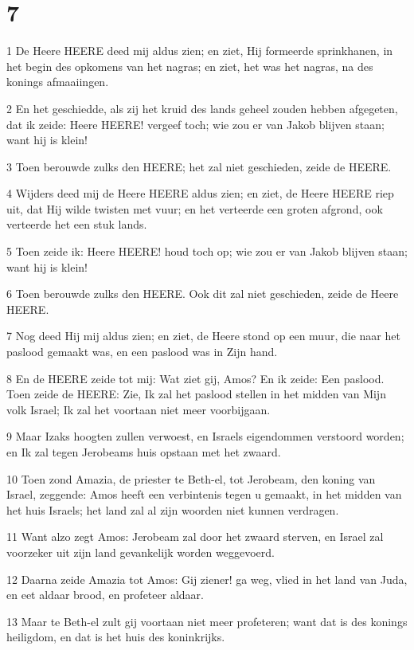 \chapter{7}

\par 1 De Heere HEERE deed mij aldus zien; en ziet, Hij formeerde sprinkhanen, in het begin des opkomens van het nagras; en ziet, het was het nagras, na des konings afmaaiingen.
\par 2 En het geschiedde, als zij het kruid des lands geheel zouden hebben afgegeten, dat ik zeide: Heere HEERE! vergeef toch; wie zou er van Jakob blijven staan; want hij is klein!
\par 3 Toen berouwde zulks den HEERE; het zal niet geschieden, zeide de HEERE.
\par 4 Wijders deed mij de Heere HEERE aldus zien; en ziet, de Heere HEERE riep uit, dat Hij wilde twisten met vuur; en het verteerde een groten afgrond, ook verteerde het een stuk lands.
\par 5 Toen zeide ik: Heere HEERE! houd toch op; wie zou er van Jakob blijven staan; want hij is klein!
\par 6 Toen berouwde zulks den HEERE. Ook dit zal niet geschieden, zeide de Heere HEERE.
\par 7 Nog deed Hij mij aldus zien; en ziet, de Heere stond op een muur, die naar het paslood gemaakt was, en een paslood was in Zijn hand.
\par 8 En de HEERE zeide tot mij: Wat ziet gij, Amos? En ik zeide: Een paslood. Toen zeide de HEERE: Zie, Ik zal het paslood stellen in het midden van Mijn volk Israel; Ik zal het voortaan niet meer voorbijgaan.
\par 9 Maar Izaks hoogten zullen verwoest, en Israels eigendommen verstoord worden; en Ik zal tegen Jerobeams huis opstaan met het zwaard.
\par 10 Toen zond Amazia, de priester te Beth-el, tot Jerobeam, den koning van Israel, zeggende: Amos heeft een verbintenis tegen u gemaakt, in het midden van het huis Israels; het land zal al zijn woorden niet kunnen verdragen.
\par 11 Want alzo zegt Amos: Jerobeam zal door het zwaard sterven, en Israel zal voorzeker uit zijn land gevankelijk worden weggevoerd.
\par 12 Daarna zeide Amazia tot Amos: Gij ziener! ga weg, vlied in het land van Juda, en eet aldaar brood, en profeteer aldaar.
\par 13 Maar te Beth-el zult gij voortaan niet meer profeteren; want dat is des konings heiligdom, en dat is het huis des koninkrijks.
